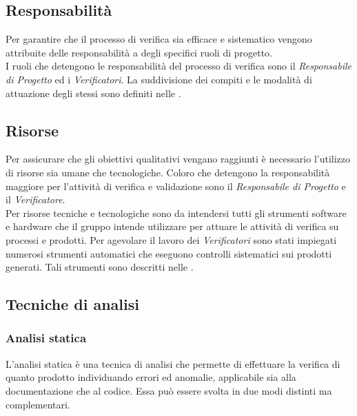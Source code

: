 \subsection{Responsabilità}
Per garantire che il processo di verifica sia efficace e sistematico vengono attribuite delle responsabilità a degli specifici ruoli di progetto.\\
I ruoli che detengono le responsabilità del processo di verifica sono il \textit{Responsabile di Progetto} ed i \textit{Verificatori}. La suddivisione dei compiti e le modalità di attuazione degli stessi sono definiti nelle \textit{\NdP}.

\subsection{Risorse}
Per assicurare che gli obiettivi qualitativi vengano raggiunti è necessario l'utilizzo di risorse sia umane che tecnologiche. Coloro che detengono la responsabilità maggiore per l'attività di verifica e validazione sono il \textit{Responsabile di Progetto} e il \textit{Verificatore}.\\
Per risorse tecniche e tecnologiche sono da intendersi tutti gli strumenti software e hardware che il gruppo intende utilizzare per attuare le attività di verifica su processi e prodotti. Per agevolare il lavoro dei \textit{Verificatori} sono stati impiegati numerosi strumenti automatici che eseguono controlli sistematici sui prodotti generati. Tali strumenti sono descritti nelle \textit{\NdP}.

\subsection{Tecniche di analisi}
\subsubsection{Analisi statica}
L'analisi statica è una tecnica di analisi che permette di effettuare la verifica di quanto prodotto individuando errori ed anomalie, applicabile sia alla documentazione che al codice. Essa può essere svolta in due modi distinti ma complementari.

